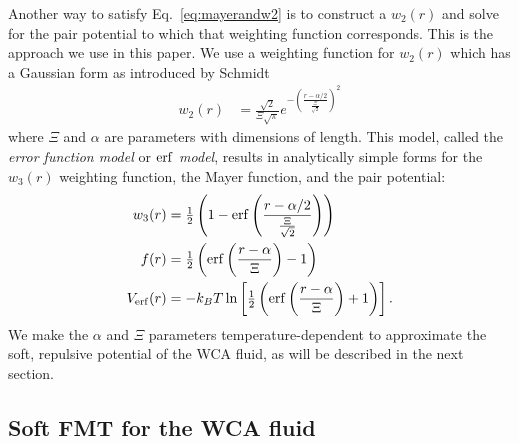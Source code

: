 \documentclass[letterpaper,twocolumn,amsmath,amssymb,prb]{revtex4-1}
\begin{document}
Another way to satisfy Eq.~\ref{eq:mayerandw2} is to 
construct a $w_2(r)$ and solve for 
the pair potential to which that weighting function corresponds.  
This is the approach we use in this paper. We use a weighting function 
for $w_2(r)$ which has a Gaussian form as introduced by Schmidt~\cite{schmidt2000fluid} 
\begin{align}
  w_2(r) &= \frac{\sqrt{2}}{\Xi \sqrt{\pi}} e^{-\left( \frac{r-\alpha/2}
  {\frac{\Xi}{\sqrt{2}}} \right)^2}
  \label{eq:gaussianw2}
\end{align}
where $\Xi$ and $\alpha$ are parameters with dimensions of length. 
This model, called the \emph{error function model} or \emph{$\mathrm{erf}$ model},
results in analytically simple forms 
for the $w_3(r)$ weighting function, the Mayer function, and the pair
potential:
\begin{align}
  w_3(r) &= \tfrac12 \left( 1 - \mathrm{erf}\left(\frac{r-\alpha/2}
  {\frac{\Xi}{\sqrt{2}}}\right) \right) \\
  f(r) &= \tfrac12 \left( \mathrm{erf}\left( \frac{r - \alpha}{\Xi} 
  \right) - 1 \right) \label{eq:mayer-approx} \\
  V_{\mathrm{erf}}(r) &= -k_BT\ln\left[\tfrac12 \left( \mathrm{erf}\left( \frac{r -
    \alpha}{\Xi} \right) + 1 \right) \right].\label{eq:Verf}
\end{align}
We make the $\alpha$ and $\Xi$ parameters temperature-dependent 
to approximate the soft, repulsive potential of the WCA fluid,
as will be described in the next section.

\subsection{Soft FMT for the WCA fluid}

\end{document}
